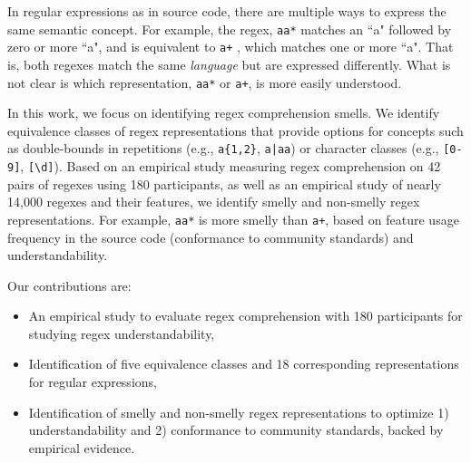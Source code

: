 In regular expressions as in source code, there are multiple ways to express the same semantic concept.
For example, the regex, \verb!aa*! matches an ``a" followed by zero or more ``a", and is equivalent to \verb!a+! , which matches one or more ``a".
That is, both regexes match the same \emph{language} but are expressed differently. What is not clear is which representation,  \verb!aa*!  or  \verb!a+!, is more easily understood.

In this work, we focus on identifying regex comprehension smells.
We  identify equivalence classes of regex representations that provide options for concepts such as double-bounds in repetitions (e.g., \verb!a{1,2}!, \verb!a|aa!) or
character classes (e.g., \verb![0-9]!, \verb![\d]!).
Based on an empirical study measuring regex comprehension on 42 pairs of regexes using 180 participants, as well as an empirical study of nearly 14,000 regexes and their features, we identify smelly and non-smelly regex representations. For example, \verb!aa*!  is more smelly than  \verb!a+!, based on feature usage frequency in the source code (conformance to community standards) and understandability.

Our contributions are:
\begin{itemize}
\item An empirical study to evaluate regex comprehension with 180 participants for studying regex understandability,
\item Identification of five equivalence classes and 18 corresponding representations for regular expressions,
\item Identification of smelly and non-smelly regex representations to optimize 1) understandability and 2) conformance to community standards, backed by empirical evidence.
\end{itemize}

